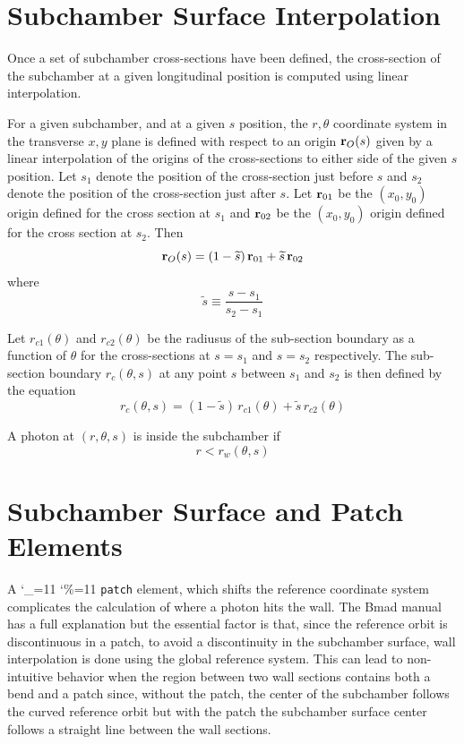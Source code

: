 \documentclass[11pt,openany]{report}
\newcommand\ttcmd{\begingroup\catcode`\_=11 \catcode`\%=11 \dottcmd}
\newcommand\dottcmd[1]{\texttt{#1}\endgroup}
\newcommand{\Begineq}{\begin{equation}}
\newcommand{\Endeq}{\end{equation}}
\newcommand{\vn}{\ttcmd}
\newcommand{\Bf}[1]{{\bf #1}}
\newcommand{\bfr}{\Bf r}
\newcommand{\stilde}{{\widetilde s}}
\begin{document}
\section{Subchamber Surface Interpolation} 
\label{s:wall}

Once a set of subchamber cross-sections have been defined, the
cross-section of the subchamber at a given longitudinal position is
computed using linear interpolation. 

For a given subchamber, and at a given $s$ position, the $r, \theta$ coordinate system in the
transverse $x, y$ plane is defined with respect to an origin $\bfr_O(s)$ given by a linear
interpolation of the origins of the cross-sections to either side of the given $s$ position. Let
$s_1$ denote the position of the cross-section just before $s$ and $s_2$ denote the position of the
cross-section just after $s$. Let $\bfr_{01}$ be the $(x_0, y_0)$ origin defined for the cross
section at $s_1$ and $\bfr_{02}$ be the $(x_0, y_0)$ origin defined for the cross section at
$s_2$. Then
\Begineq
  \bfr_O(s) = (1 - \stilde) \, \bfr_{01} + \stilde \, \bfr_{02}
\Endeq
where 
\Begineq
  \stilde \equiv \frac{s - s_1}{s_2 - s_1}
\Endeq

Let $r_{c1}(\theta)$ and $r_{c2}(\theta)$ be the radiusus of the
sub-section boundary as a function of $\theta$ for the cross-sections
at $s = s_1$ and $s = s_2$ respectively. The sub-section boundary
$r_c(\theta, s)$ at any point $s$ between $s_1$ and $s_2$ is then
defined by the equation
\Begineq
  r_c(\theta, s) = (1 - \stilde) \, r_{c1}(\theta) + \stilde \, r_{c2}(\theta)
\Endeq

A photon at $(r,\theta, s)$ is inside the subchamber if
\Begineq
  r < r_w(\theta, s)
\Endeq

\section{Subchamber Surface and Patch Elements}
\label{s:patch}

A \vn{patch} element, which shifts the reference coordinate system
complicates the calculation of where a photon hits the wall. The Bmad
manual has a full explanation but the essential factor is that, since
the reference orbit is discontinuous in a patch, to avoid a
discontinuity in the subchamber surface, wall interpolation is done using
the global reference system. This can lead to non-intuitive behavior
when the region between two wall sections contains both a bend and a
patch since, without the patch, the center of the subchamber follows the
curved reference orbit but with the patch the subchamber surface center
follows a straight line between the wall sections.
\end{document}
